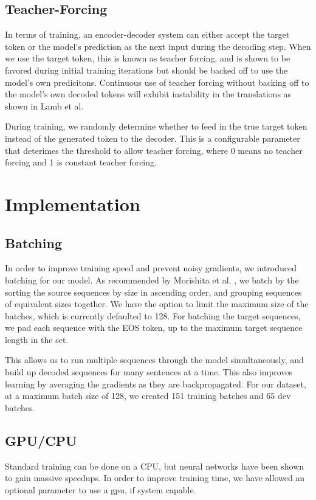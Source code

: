 \documentclass[twoside,twocolumn]{article}
\begin{document}
\subsection{Teacher-Forcing}
In terms of training, an encoder-decoder system can either accept the target
token or the model's prediction as the next input during the decoding step.
When we use the target token, this is known as teacher forcing, and is
shown to be favored during initial training iterations but should be backed
off to use the model's own predicitons. Continuous use of teacher forcing
without backing off to the model's own decoded tokens will exhibit instability
in the translations as shown in Lamb et al. \cite{lamb2016professor}

During training, we randomly determine whether to feed in the true target
token instead of the generated token to the decoder. This is a configurable
parameter that deterimes the threshold to allow teacher forcing, where 0 means
no teacher forcing and 1 is constant teacher forcing.
\section{Implementation}
\label{sec:implementation}
\subsection{Batching}
In order to improve training speed and prevent noisy gradients, we introduced
batching for our model. As recommended by Morishita et al.
\cite{morishita2017empirical}, we batch by the sorting the source sequences by
size in ascending order, and grouping sequences of equivalent sizes together.
We have the option to limit the maximum size of the batches, which is currently
defaulted to 128. For batching the target sequences, we pad each sequence with
the EOS token, up to the maximum target sequence length in the set.

This allows us to run multiple sequences through the model simultaneously,
and build up decoded sequences for many sentences at a time. This also improves
learning by averaging the gradients as they are backpropagated. For our
dataset, at a maximum batch size of 128, we created 151 training batches and
65 dev batches.
\subsection{GPU/CPU}
Standard training can be done on a CPU, but neural networks have been shown to
gain massive speedups. In order to improve training time,
we have allowed an optional parameter to use a gpu, if system capable.
\end{document}
